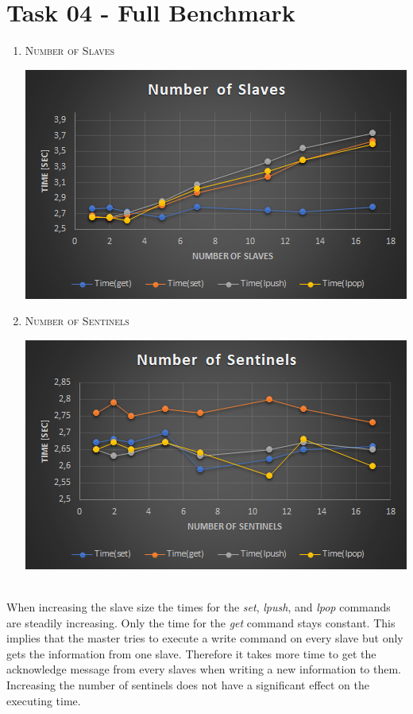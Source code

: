 \documentclass{article}
\begin{document}
	\newpage
	
	\section*{Task 04 - Full Benchmark}
	\begin{adjustwidth}{2em}{2em}
		\begin{enumerate}[\tiny\textbullet]
			\item \textsc{Number of Slaves}
			\begin{center}
				\includegraphics[scale=0.55]{Task_04_Slaves.png}
			\end{center}
			\item \textsc{Number of Sentinels}
			\begin{center}
				\includegraphics[scale=0.55]{Task_04_Sentinels.png}
			\end{center}
		\end{enumerate}
		\hfill \\
		When increasing the slave size the times for the \textit{set}, \textit{lpush}, and \textit{lpop} commands are steadily increasing. Only the time for the \textit{get} command stays constant. This implies that the master tries to execute a write command on every slave but only gets the information from one slave. Therefore it takes more time to get the acknowledge message from every slaves when writing a new information to them. \\
		Increasing the number of sentinels does not have a significant effect on the executing time.
	\end{adjustwidth}
	
\end{document}
